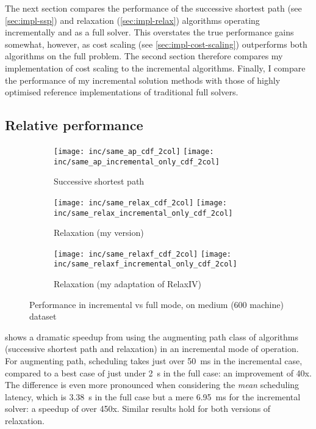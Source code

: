 The next section compares the performance of the successive shortest path (see \cref{sec:impl-ssp}) and relaxation (\cref{sec:impl-relax}) algorithms operating incrementally and as a full solver. This overstates the true performance gains somewhat, however, as cost scaling (see \cref{sec:impl-cost-scaling}) outperforms both algorithms on the full problem. The second section therefore compares my implementation of cost scaling to the incremental algorithms. Finally, I compare the performance of my incremental solution methods with those of highly optimised reference implementations of traditional full solvers.

\subsection{Relative performance}

\begin{figure}
    \begin{widepage}
        \begin{subfigure}[c]{\textwidth}
            \texttt{[image: inc/same\_ap\_cdf\_2col]}
            \texttt{[image: inc/same\_ap\_incremental\_only\_cdf\_2col]}
            \caption{Successive shortest path}
        \end{subfigure}
        \begin{subfigure}[c]{\textwidth}
            \texttt{[image: inc/same\_relax\_cdf\_2col]}                        \texttt{[image: inc/same\_relax\_incremental\_only\_cdf\_2col]}
            \caption{Relaxation (my version)}
        \end{subfigure}
        \begin{subfigure}[c]{\textwidth}
            \texttt{[image: inc/same\_relaxf\_cdf\_2col]}
            \texttt{[image: inc/same\_relaxf\_incremental\_only\_cdf\_2col]}
            \caption{Relaxation (my adaptation of RelaxIV)}
        \end{subfigure}
    \end{widepage}
    \caption{Performance in incremental vs full mode, on medium (600 machine) dataset}
    \label{fig:inc-same}
\end{figure}

 shows a dramatic speedup from using the augmenting path class of algorithms (successive shortest path and relaxation) in an incremental mode of operation. For augmenting path, scheduling takes just over \SI{50}{\milli\second} in the incremental case, compared to a best case of just under \SI{2}{\second} in the full case: an improvement of 40x. The difference is even more pronounced when considering the \emph{mean} scheduling latency, which is \SI{3.38}{\second} in the full case but a mere \SI{6.95}{\milli\second} for the incremental solver: a speedup of over 450x. Similar results hold for both versions of relaxation.

